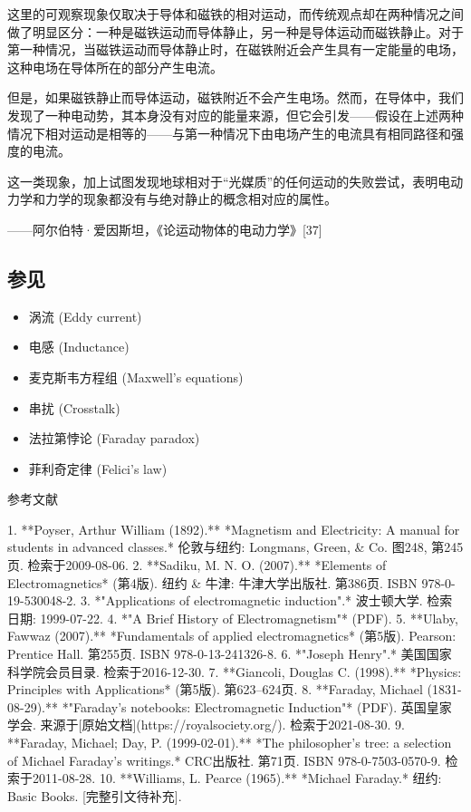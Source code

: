 这里的可观察现象仅取决于导体和磁铁的相对运动，而传统观点却在两种情况之间做了明显区分：一种是磁铁运动而导体静止，另一种是导体运动而磁铁静止。对于第一种情况，当磁铁运动而导体静止时，在磁铁附近会产生具有一定能量的电场，这种电场在导体所在的部分产生电流。

但是，如果磁铁静止而导体运动，磁铁附近不会产生电场。然而，在导体中，我们发现了一种电动势，其本身没有对应的能量来源，但它会引发——假设在上述两种情况下相对运动是相等的——与第一种情况下由电场产生的电流具有相同路径和强度的电流。

这一类现象，加上试图发现地球相对于“光媒质”的任何运动的失败尝试，表明电动力学和力学的现象都没有与绝对静止的概念相对应的属性。

——阿尔伯特·爱因斯坦，《论运动物体的电动力学》[37]
\subsection{参见}
\begin{itemize}
\item 涡流 (Eddy current)  
\item 电感 (Inductance)  
\item 麦克斯韦方程组 (Maxwell's equations)  
\item 串扰 (Crosstalk)  
\item 法拉第悖论 (Faraday paradox)  
\item 菲利奇定律 (Felici's law)  
\end{itemize}
参考文献

1. **Poyser, Arthur William (1892).** *Magnetism and Electricity: A manual for students in advanced classes.* 伦敦与纽约: Longmans, Green, & Co. 图248, 第245页. 检索于2009-08-06.  
2. **Sadiku, M. N. O. (2007).** *Elements of Electromagnetics* (第4版). 纽约 & 牛津: 牛津大学出版社. 第386页. ISBN 978-0-19-530048-2.  
3. *"Applications of electromagnetic induction".* 波士顿大学. 检索日期: 1999-07-22.  
4. *"A Brief History of Electromagnetism"* (PDF).  
5. **Ulaby, Fawwaz (2007).** *Fundamentals of applied electromagnetics* (第5版). Pearson: Prentice Hall. 第255页. ISBN 978-0-13-241326-8.  
6. *"Joseph Henry".* 美国国家科学院会员目录. 检索于2016-12-30.  
7. **Giancoli, Douglas C. (1998).** *Physics: Principles with Applications* (第5版). 第623–624页.  
8. **Faraday, Michael (1831-08-29).** *"Faraday's notebooks: Electromagnetic Induction"* (PDF). 英国皇家学会. 来源于[原始文档](https://royalsociety.org/). 检索于2021-08-30.  
9. **Faraday, Michael; Day, P. (1999-02-01).** *The philosopher's tree: a selection of Michael Faraday's writings.* CRC出版社. 第71页. ISBN 978-0-7503-0570-9. 检索于2011-08-28.  
10. **Williams, L. Pearce (1965).** *Michael Faraday.* 纽约: Basic Books. [完整引文待补充].  